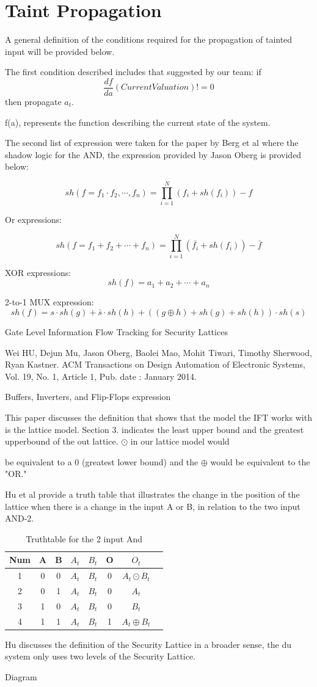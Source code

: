 \section{Taint Propagation}
A general definition of the conditions required for the propagation of tainted input will be provided below.  

The first condition described includes that suggested by our team:
if \[ \frac{df}{da}(Current Valuation) != 0 \]
then propagate $a_t$.

f(a), represents the function describing the current state of the system. 


The second list of expression were taken for the paper by Berg et al where the shadow logic for the AND, the expression provided by Jason Oberg is provided below:

\[ sh(f=f_1 \cdot f_2,\cdots,f_n) = \prod_{i=1}^{N} (f_i + sh(f_i)) - f \] 


Or expressions:

\[ sh(f=f_1 + f_2 +\cdots+f_n) = \prod_{i=1}^{N} (\bar{f_i} + sh(f_i)) - \bar{f} \] 

XOR expressions:
\[sh(f) = a_1 + a_2 +\cdots+ a_n\]

2-to-1 MUX expression:
\[sh(f) = s\cdot sh(g) + \bar{s}\cdot sh(h) + ((g \oplus h) +sh(g)+sh(h)) \cdot sh(s)\]

Gate Level Information Flow Tracking for Security Lattices

Wei HU, Dejun Mu, Jason Oberg, Baolei Mao, Mohit Tiwari, Timothy Sherwood, Ryan Kastner. ACM Transactions on Design Automation of Electronic Systems, Vol. 19, No. 1, Article 1, Pub. date : January 2014.

Buffers, Inverters, and Flip-Flops expression

This paper discusses the definition that shows that the model the IFT works with is the lattice model. Section 3. indicates the least upper bound and the greatest upperbound of the out lattice. $\odot$ in our lattice model would 
\newpage

be equivalent to a 0 (greatest lower bound) and the $\oplus$ would be equivalent to the "OR."

Hu et al provide a truth table that illustrates the change in the position of the lattice when there is a change in the input A or B, in relation to the two input AND-2.
\begin{table}
  \begin{center}
  \caption{Truthtable for the 2 input And}
  \label{tab: table1}
  \begin{tabular}{|c|c|c|c|c|c|c|c}
  \hline
  \textbf{Num}& \textbf{A} & \textbf{B} & \textbf{$A_t$} & \textbf{ $B_t$} & \textbf{O} & \textbf{$O_t$}\\
  \hline\hline
  1 & 0 & 0 & $A_t$ & $B_t$ & 0 & $A_t \odot B_t$\\
  2 & 0 & 1 & $A_t$ & $B_t$ & 0 & $A_t$\\
  3 & 1 & 0 & $A_t$ & $B_t$ & 0 & $B_t$\\
  4 & 1 & 1 & $A_t$ & $B_t$ & 1 & $A_t \oplus B_t$\\
  \hline
  \end{tabular}
  \end{center}
\end{table}

Hu discusses the definition of the Security Lattice in a broader sense, the du system only uses two levels of the Security Lattice.  

Diagram

